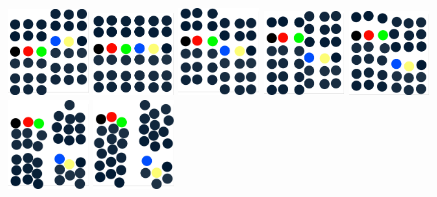 \documentclass{article}
\begin{document}
\begin{figure}
  \includegraphics[width=0.19\textwidth]{graph3d_009.eps}
  \includegraphics[width=0.19\textwidth]{graph3d_011.eps}
  \includegraphics[width=0.19\textwidth]{graph3d_012.eps}
  \includegraphics[width=0.19\textwidth]{graph3d_013.eps}
  \includegraphics[width=0.19\textwidth]{graph3d_014.eps}
  \includegraphics[width=0.19\textwidth]{graph3d_015.eps}
  \includegraphics[width=0.19\textwidth]{graph3d_016.eps}

\end{figure}
\end{document}
